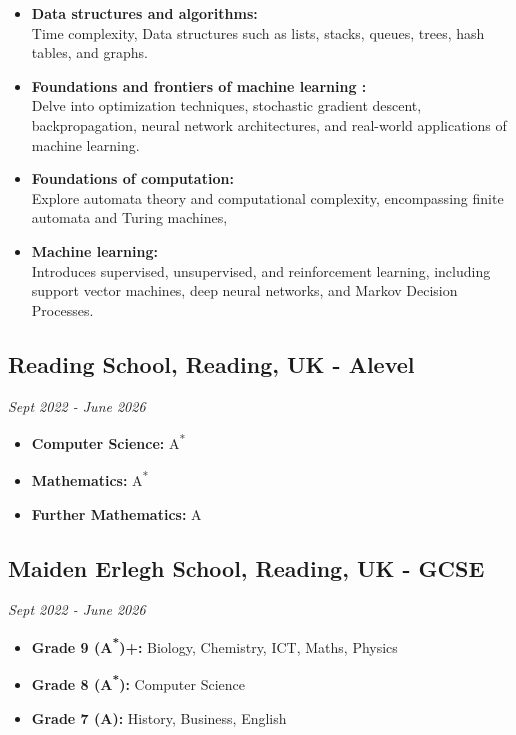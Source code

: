 \documentclass[11pt,a4paper,sans]{moderncv}        %
\begin{document}
\begin{multicols}{2}
\begin{itemize}
{\begin{itemize}
                \item \textbf{Data structures and algorithms:}\\
               Time complexity, Data structures such as lists, stacks, queues, trees, hash tables, and graphs.
                
                \item \textbf{Foundations and frontiers of machine learning :}\\
                Delve into optimization techniques, stochastic gradient descent, backpropagation, neural network architectures, and real-world applications of machine learning.
    
                \item \textbf{Foundations of computation:}\\
                 Explore automata theory and computational complexity, encompassing finite automata and Turing machines, 

                \item \textbf{Machine learning: }\\
                Introduces supervised, unsupervised, and reinforcement learning, including support vector machines, deep neural networks, and Markov Decision Processes.
            \end{itemize} 
        }
\end{itemize}
\subsection{Reading School, Reading, UK - Alevel}
\textit{Sept 2022 - June 2026}
\begin{itemize}
    \item \textbf{Computer Science:} A\textsuperscript{*}
    \item \textbf{Mathematics:} A\textsuperscript{*}
    \item \textbf{Further Mathematics:} A
\end{itemize}

\subsection{Maiden Erlegh School, Reading, UK - GCSE}
\textit{Sept 2022 - June 2026}
\begin{itemize}
    \item \textbf{Grade 9 (A\textsuperscript{*})+:}  Biology, Chemistry,  ICT, Maths, Physics
    \item \textbf{Grade 8 (A\textsuperscript{*}):} Computer Science 
    \item \textbf{Grade 7 (A):} History, Business, English
\end{itemize}



\end{multicols}
\end{document}
